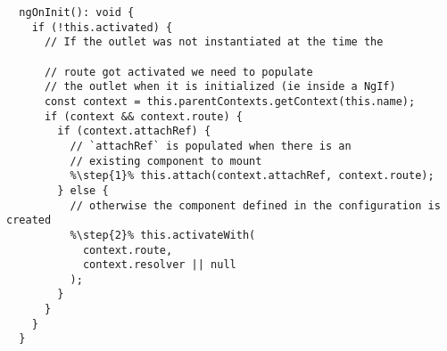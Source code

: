 \begin{verbatim}
  ngOnInit(): void {
    if (!this.activated) {
      // If the outlet was not instantiated at the time the

      // route got activated we need to populate
      // the outlet when it is initialized (ie inside a NgIf)
      const context = this.parentContexts.getContext(this.name);
      if (context && context.route) {
        if (context.attachRef) {
          // `attachRef` is populated when there is an
          // existing component to mount
          %\step{1}% this.attach(context.attachRef, context.route);
        } else {
          // otherwise the component defined in the configuration is created
          %\step{2}% this.activateWith(
            context.route,
            context.resolver || null
          );
        }
      }
    }
  }
\end{verbatim}

